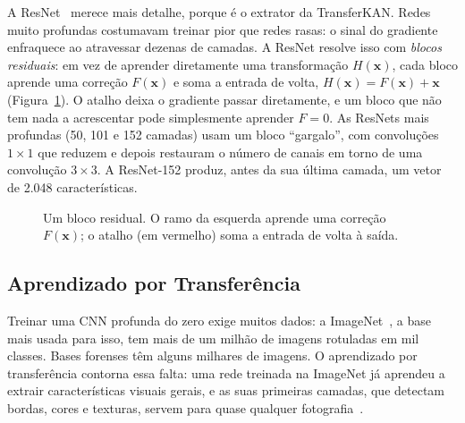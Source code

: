 A ResNet~\cite{he2016resnet} merece mais detalhe, porque é o extrator da TransferKAN. Redes muito profundas costumavam treinar pior que redes rasas: o sinal do gradiente enfraquece ao atravessar dezenas de camadas. A ResNet resolve isso com \emph{blocos residuais}: em vez de aprender diretamente uma transformação $H(\mathbf{x})$, cada bloco aprende uma correção $F(\mathbf{x})$ e soma a entrada de volta, $H(\mathbf{x}) = F(\mathbf{x}) + \mathbf{x}$ (Figura~\ref{fig:residual}). O atalho deixa o gradiente passar diretamente, e um bloco que não tem nada a acrescentar pode simplesmente aprender $F = 0$. As ResNets mais profundas (50, 101 e 152 camadas) usam um bloco ``gargalo'', com convoluções $1 \times 1$ que reduzem e depois restauram o número de canais em torno de uma convolução $3 \times 3$. A ResNet-152 produz, antes da sua última camada, um vetor de 2.048 características.

\begin{figure}[htpb]
\centering
{}
\caption{Um bloco residual. O ramo da esquerda aprende uma correção $F(\mathbf{x})$; o atalho (em vermelho) soma a entrada de volta à saída.}
\label{fig:residual}
\end{figure}

\subsection{Aprendizado por Transferência}
\label{sec:transfer_background}

Treinar uma CNN profunda do zero exige muitos dados: a ImageNet~\cite{deng2009imagenet}, a base mais usada para isso, tem mais de um milhão de imagens rotuladas em mil classes. Bases forenses têm alguns milhares de imagens. O aprendizado por transferência contorna essa falta: uma rede treinada na ImageNet já aprendeu a extrair características visuais gerais, e as suas primeiras camadas, que detectam bordas, cores e texturas, servem para quase qualquer fotografia~\cite{yosinski2014transferable}.


